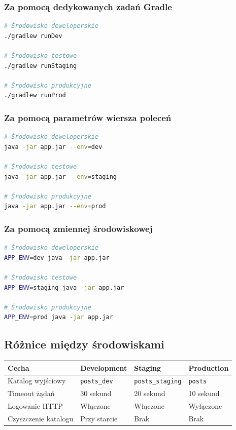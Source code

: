 \documentclass[12pt,a4paper]{article}
\begin{document}
\subsubsection{Za pomocą dedykowanych zadań Gradle}
\begin{lstlisting}[language=bash]
# Środowisko deweloperskie
./gradlew runDev

# Środowisko testowe
./gradlew runStaging

# Środowisko produkcyjne
./gradlew runProd
\end{lstlisting}

\subsubsection{Za pomocą parametrów wiersza poleceń}
\begin{lstlisting}[language=bash]
# Środowisko deweloperskie
java -jar app.jar --env=dev

# Środowisko testowe
java -jar app.jar --env=staging

# Środowisko produkcyjne
java -jar app.jar --env=prod
\end{lstlisting}

\subsubsection{Za pomocą zmiennej środowiskowej}
\begin{lstlisting}[language=bash]
# Środowisko deweloperskie
APP_ENV=dev java -jar app.jar

# Środowisko testowe
APP_ENV=staging java -jar app.jar

# Środowisko produkcyjne
APP_ENV=prod java -jar app.jar
\end{lstlisting}

\subsection{Różnice między środowiskami}

\begin{tabular}{|p{3.5cm}|p{3.5cm}|p{3.5cm}|p{3.5cm}|}
\hline
\textbf{Cecha} & \textbf{Development} & \textbf{Staging} & \textbf{Production} \\
\hline
Katalog wyjściowy & \texttt{posts\_dev} & \texttt{posts\_staging} & \texttt{posts} \\
\hline
Timeout żądań & 30 sekund & 20 sekund & 10 sekund \\
\hline
Logowanie HTTP & Włączone & Włączone & Wyłączone \\
\hline
Czyszczenie katalogu & Przy starcie & Brak & Brak \\
\hline
\end{tabular}
\end{document}
